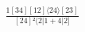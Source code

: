 \documentclass[varwidth, border=5pt]{standalone}
\begin{document}
\begin{my}
$\begin{gathered}
\scriptscriptstyle\frac{1[34][12]⟨24⟩[23]}{[24]²⟨2|1+4|2]}
\end{gathered}$
\end{my}
\end{document}
